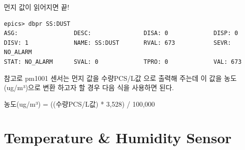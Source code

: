 \documentclass[11pt
  , a4paper
  , article
  , oneside
]{memoir}
\begin{document}
먼지 값이 읽어지면 끝!
\begin{lstlisting}[style=termstyle]
epics> dbpr SS:DUST
ASG:                DESC:               DISA: 0             DISP: 0             
DISV: 1             NAME: SS:DUST       RVAL: 673           SEVR: NO_ALARM      
STAT: NO_ALARM      SVAL: 0             TPRO: 0             VAL: 673
\end{lstlisting}
참고로 pm1001 센서는 먼지 값을 수량PCS/L값 으로 출력해 주는데 이 값을 농도(ug/m³)으로 변환 하고자 할 경우 다음 식을 사용하면 된다.

        농도(ug/m³) = ((수량PCS/L값) * 3,528) / 100,000

\section{Temperature \& Humidity Sensor}
\end{document}
